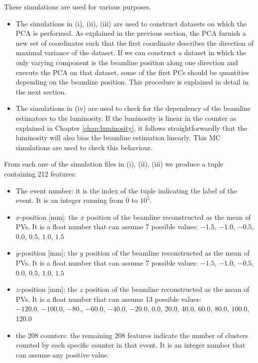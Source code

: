 These simulations are used for various purposes. 
\begin{itemize}
\item The simulations in (i), (ii), (iii) are used to construct datasets on which the PCA is performed. As explained in the previous section, the PCA furnish a new set of coordinates such that the first coordinate describes the direction of maximal variance of the dataset. If we can construct a dataset in which the only varying component is the beamline position along one direction and execute the PCA on that dataset, some of the first PCs should be quantities depending on the beamline position. This procedure is explained in detail in the next section.
\item The simulations in (iv) are used to check for the dependency of the beamline estimators to the luminosity. If the luminosity is linear in the counter as explained in Chapter \ref{chap:luminosity}, it follows straightforwardly that the luminosity will also bias the beamline estimation linearly. This MC simulations are used to check this behaviour.
\end{itemize}

From each one of the simulation files in (i), (ii), (iii) we produce a tuple containing 212 features:
\begin{itemize}
    \item The event number: it is the index of the tuple indicating the label of the event. It is an integer running from $0$ to $10^5$.
    \item $x$-position [mm]: the $x$ position of the beamline reconstructed as the mean of PVs. It is a float number that can assume 7 possible values: $-1.5$, $-1.0$, $-0.5$, $0.0$, $0.5$, $1.0$, $1.5$
    \item $y$-position [mm]: the $y$ position of the beamline reconstructed as the mean of PVs. It is a float number that can assume 7 possible values: $-1.5$, $-1.0$, $-0.5$, $0.0$, $0.5$, $1.0$, $1.5$
    \item $z$-position [mm]: the $z$ position of the beamline reconstructed as the mean of PVs. It is a float number that can assume 13 possible values: \\
    $-120.0$, $-100.0$, $-80.$, $-60.0$, $-40.0$, $-20.0$, $0.0$, $20.0$, $40.0$, $60.0$, $80.0$, $100.0$, $120.0$
    \item the 208 counters: the remaining 208 features indicate the number of clusters counted by each specific counter in that event. It is an integer number that can assume any positive value.
\end{itemize}

